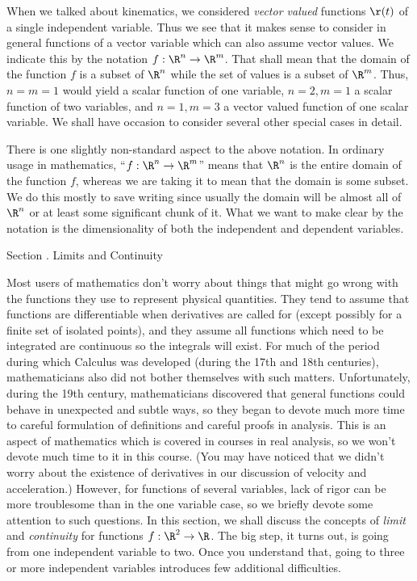 When we talked about kinematics, we considered  {\it vector valued\/}
functions $\r(t)$ of a single independent variable.    Thus we see
that it makes sense to consider in general functions of a vector
variable which can also assume vector values.   We indicate this
by the notation $f:\R^n \to \R^m$.   That shall mean that the domain
of the function $f$ is a subset of $\R^n$ while the set of values is
a subset of $\R^m$.    Thus, $n = m = 1$ would yield a scalar
function of one variable, $n = 2, m = 1$ a scalar function of two
variables, and $n = 1, m = 3$ a vector valued function of one scalar
variable.   We shall have occasion to consider several other special
cases in detail.

There is one slightly non-standard aspect to the above notation.
In ordinary usage in mathematics,
``$f:\R^n \to \R^m$'' means that $\R^n$ is the entire domain of the
function $f$, whereas we are taking it to mean that the domain is some
subset.    We do this mostly to save writing since usually the
domain will be almost all of $\R^n$  or at least some significant
chunk of it.  What we want to make clear by the notation is the
dimensionality of both the independent and dependent variables.

\bigskip

\bigskip
{}
\head Section \sn.  Limits and Continuity \endhead

Most users of mathematics don't worry about things that might
go wrong with the functions they use to represent physical quantities.
They tend to assume that  functions  are differentiable when derivatives
are called for  (except possibly for a finite set of isolated points),
and they assume all functions which need to be integrated are continuous
so the integrals will exist.   For much of the period during which
Calculus was developed (during the 17th and 18th centuries), mathematicians
also did not bother themselves with such matters.   Unfortunately,
during the 19th century, mathematicians discovered that general
functions could behave in  unexpected and subtle ways, so they began to 
devote much more time to careful formulation of definitions and careful
proofs in analysis.   This is an aspect of mathematics which is
covered in courses in real analysis, so we won't devote much time
to it in this course.  (You may have noticed that we didn't worry
about the existence of derivatives in our discussion of
velocity and acceleration.)  However, 
for functions of several variables,
lack of rigor can be more troublesome than in
the one variable case,  so we briefly devote some attention to such
questions.
 In this section, we shall discuss the concepts
of {\it limit\/} and {\it continuity\/} for functions $f:\R^2 \to \R$.
The big step, it turns out, is going from one independent 
variable to two.
Once you understand that, going to three or more
independent variables introduces
few additional difficulties.


